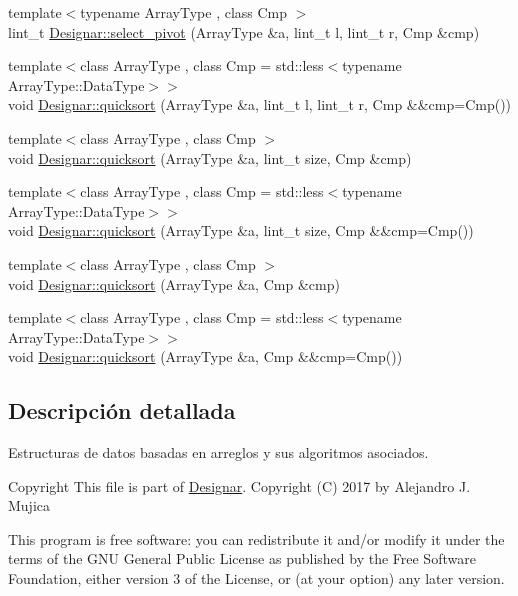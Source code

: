 \begin{DoxyCompactItemize}
\item 
{\footnotesize template$<$typename Array\+Type , class Cmp $>$ }\\lint\+\_\+t \hyperlink{namespace_designar_ac3674dae50d8d382e25a5fce8775294c}{Designar\+::select\+\_\+pivot} (Array\+Type \&a, lint\+\_\+t l, lint\+\_\+t r, Cmp \&cmp)
\item 
{\footnotesize template$<$class Array\+Type , class Cmp  = std\+::less$<$typename Array\+Type\+::\+Data\+Type$>$$>$ }\\void \hyperlink{namespace_designar_af359499060a9d2b8e282ae9def049e17}{Designar\+::quicksort} (Array\+Type \&a, lint\+\_\+t l, lint\+\_\+t r, Cmp \&\&cmp=Cmp())
\item 
{\footnotesize template$<$class Array\+Type , class Cmp $>$ }\\void \hyperlink{namespace_designar_a4887d9486cdfcd7e021047915ae26651}{Designar\+::quicksort} (Array\+Type \&a, lint\+\_\+t size, Cmp \&cmp)
\item 
{\footnotesize template$<$class Array\+Type , class Cmp  = std\+::less$<$typename Array\+Type\+::\+Data\+Type$>$$>$ }\\void \hyperlink{namespace_designar_a3b84da2b14868b20993ec9687e3c29c4}{Designar\+::quicksort} (Array\+Type \&a, lint\+\_\+t size, Cmp \&\&cmp=Cmp())
\item 
{\footnotesize template$<$class Array\+Type , class Cmp $>$ }\\void \hyperlink{namespace_designar_ae6156420cc82f38302cc7b7c837275b1}{Designar\+::quicksort} (Array\+Type \&a, Cmp \&cmp)
\item 
{\footnotesize template$<$class Array\+Type , class Cmp  = std\+::less$<$typename Array\+Type\+::\+Data\+Type$>$$>$ }\\void \hyperlink{namespace_designar_a75b9270f723888eb32e0b8f78032f0df}{Designar\+::quicksort} (Array\+Type \&a, Cmp \&\&cmp=Cmp())
\end{DoxyCompactItemize}


\subsection{Descripción detallada}
Estructuras de datos basadas en arreglos y sus algoritmos asociados. 

\begin{DoxyCopyright}{Copyright}
This file is part of \hyperlink{namespace_designar}{Designar}. Copyright (C) 2017 by Alejandro J. Mujica
\end{DoxyCopyright}
This program is free software\+: you can redistribute it and/or modify it under the terms of the G\+NU General Public License as published by the Free Software Foundation, either version 3 of the License, or (at your option) any later version.

